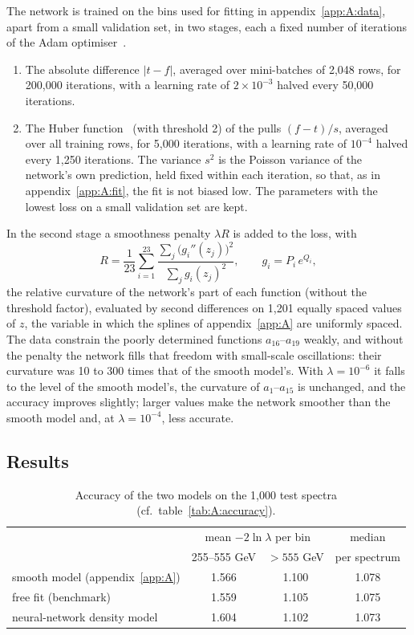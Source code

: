 The network is trained on the bins used for fitting in appendix~\ref{app:A:data}, apart from a small validation set, in two
stages, each a fixed number of iterations of the Adam optimiser~\cite{Kingma:2014vow}.
\begin{enumerate}
  \item The absolute difference $|t - f|$, averaged over mini-batches of 2,048 rows, for 200,000 iterations, with a
    learning rate of $2\times10^{-3}$ halved every 50,000 iterations.
  \item The Huber function~\cite{Huber:1964} (with threshold 2) of the pulls $(f - t)/s$, averaged over all training
    rows, for 5,000 iterations, with a learning rate of $10^{-4}$ halved every 1,250 iterations. The variance $s^2$ is
    the Poisson variance of the network's own prediction, held fixed within each iteration, so that, as in
    appendix~\ref{app:A:fit}, the fit is not biased low. The parameters with the lowest loss on a small validation set
    are kept.
\end{enumerate}
In the second stage a smoothness penalty $\lambda R$ is added to the loss, with
\begin{equation}
  R = \frac{1}{23}\sum_{i=1}^{23}\frac{\sum_j \big(g_i''(z_j)\big)^2}{\sum_j g_i(z_j)^2}, \qquad g_i = P_i\,e^{Q_i},
  \label{eq:B:penalty}
\end{equation}
the relative curvature of the network's part of each function (without the threshold factor), evaluated by second
differences on 1,201 equally spaced values of $z$, the variable in which the splines of appendix~\ref{app:A} are
uniformly spaced. The data constrain the poorly determined functions $a_{16}$--$a_{19}$ weakly, and without the penalty the
network fills that freedom with small-scale oscillations: their curvature was 10 to 300 times that of the smooth model's.
With $\lambda = 10^{-6}$ it falls to the level of the smooth model's, the curvature of $a_1$--$a_{15}$ is unchanged, and the
accuracy improves slightly; larger values make the network smoother than the smooth model and, at $\lambda = 10^{-4}$, less
accurate.

\subsection{Results}
\label{app:B:results}

\begin{table}[!htbp]
\centering
\small
\begin{tabular}{lccc}
\toprule
 & \multicolumn{2}{c}{mean $-2\ln\lambda$ per bin} & median \\
 & 255--555 GeV & $>555$ GeV & per spectrum \\
\midrule
smooth model (appendix~\ref{app:A}) & 1.566 & 1.100 & 1.078 \\
free fit (benchmark)                & 1.559 & 1.105 & 1.075 \\
neural-network density model        & 1.604 & 1.102 & 1.073 \\
\bottomrule
\end{tabular}
\caption{Accuracy of the two models on the 1,000 test spectra (cf.\ table~\ref{tab:A:accuracy}).}
\label{tab:B:accuracy}
\end{table}

